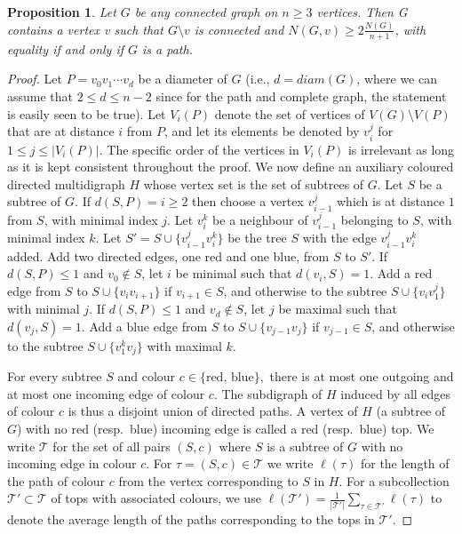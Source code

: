 \documentclass[11pt]{article}
\newtheorem{prop}[thr]{Proposition}
\theoremstyle{definition}
\newcommand{\diam}{diam}
\newcommand*{\abs}[1]{\lvert #1\rvert}
\begin{document}
\begin{prop}\label{Fraction}
 Let $G$ be any connected graph on $n \ge 3$ vertices. Then G contains a vertex v such that $G \setminus v$ is connected and $N(G, v) \ge 2\frac{N(G)}{n+1}$, with equality if and only if $G$ is a path.
\end{prop}

\begin{proof}
    Let $P=v_0v_1 \cdots v_{d}$ be a diameter of $G$ (i.e., $d=\diam(G)$, where we can assume that $2 \le d \le n-2$ since for the path and complete graph, the statement is easily seen to be true).
    Let $V_i(P)$ denote the set of vertices of $V(G) \setminus V(P)$ that are at distance $i$ from $P$, and let its elements be denoted by $v_i^j$ for $1 \le j \le \abs{V_i(P)}$. The specific order of the vertices in $V_i(P)$ is irrelevant as long as it is kept consistent throughout the proof.
    We now define an auxiliary coloured directed multidigraph $H$ whose vertex set is the set of subtrees of $G$.
    Let $S$ be a subtree of $G$. If $d(S,P)=i\ge 2$ then choose a vertex $v_{i-1}^j$ which is at distance $1$ from $S$, with minimal index $j$.
    Let $v_i^{k}$ be a neighbour of $v_{i-1}^j$ belonging to $S$, with minimal index $k$.
    Let $S'=S \cup \{v_{i-1}^jv_i^{k}\}$ be the tree $S$ with the edge $v_{i-1}^jv_i^{k}$ added.
  Add two directed edges, one red and one blue, from $S$ to $S'$.
  If $d(S,P)\le 1$ and $v_0\not\in S$, let $i$ be minimal such that $d(v_i,S)=1$. Add a red edge from $S$ to $S\cup\{v_iv_{i+1}\}$ if $v_{i+1} \in S$, and otherwise to the subtree $S\cup\{v_iv_1^j\}$ with minimal $j$. 
  If $d(S,P)\le 1$ and $v_d\not\in S$, let $j$ be maximal such that $d(v_j,S)=1$. Add a blue edge from $S$ to $S\cup\{v_{j-1}v_j\}$ if $v_{j-1} \in S$, and otherwise to the subtree $S\cup\{v_1^kv_j\}$ with maximal $k$.
  
  For every subtree $S$ and colour $c \in \{\text{red, blue}\},$ there is at most one outgoing and at most one incoming edge of colour $c$.
  The subdigraph of $H$ induced by all edges of colour $c$ is thus a disjoint union of directed paths.
    A vertex of $H$ (a subtree of $G$) with no red (resp.~blue) incoming edge is called a red (resp.~blue) top.
    We write $\mathcal T$ for the set of all pairs $(S,c)$ where $S$ is a subtree of $G$ with no incoming edge in colour $c$. For $\tau=(S,c)\in\mathcal T$ we write $\ell(\tau)$ for the length of the path of colour $c$ from the vertex corresponding to $S$ in $H$.
    For a subcollection $\mathcal T'\subset \mathcal T$ of tops with associated colours, we use $\ell(\mathcal T')=\frac{1}{\abs{ \mathcal T'} } \sum_{\tau \in \mathcal T'} \ell(\tau)$ to denote the average length of the paths corresponding to the tops in $\mathcal T'$.


\end{proof}
\end{document}
